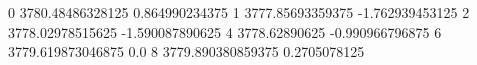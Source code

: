 0 3780.48486328125 0.864990234375
1 3777.85693359375 -1.762939453125
2 3778.02978515625 -1.590087890625
4 3778.62890625 -0.990966796875
6 3779.619873046875 0.0
8 3779.890380859375 0.2705078125
